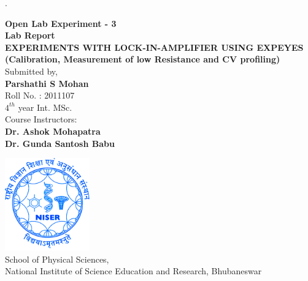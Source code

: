 \documentclass{article}
\begin{document}
\begin{titlepage}
.
\centering


\vspace{.7in}

\textup{\Large {\bf Open Lab Experiment - 3}
}\\[0.3in]
\textup{\Large {\bf Lab Report}
}\\[0.5in]
\Large \textbf {EXPERIMENTS WITH LOCK-IN-AMPLIFIER USING EXPEYES
(Calibration, Measurement of low Resistance and CV profiling)}\\[0.5in]


       

\Large Submitted by, \\[0.3in]
\Large\textbf{Parshathi S Mohan}\\[0.1in]
\Large{Roll No. : 2011107}\\[0.1in]

\Large{$4^{th}$ year Int. MSc.}\\[0.1in]


\vspace{.2in}
\centering
\Large Course Instructors: \\[0.2in]
\Large\textbf{Dr. Ashok Mohapatra}\\[0.1in]
\Large\textbf{Dr. Gunda Santosh Babu}\\[0.1in]
\vspace{.3in}

\includegraphics[height=4cm]{Images/niser-logo-blue.jpg}\\
\vspace{.3in}
School of Physical Sciences,\\[0.1in]

\Large{National Institute of Science Education and Research, Bhubaneswar}




\end{titlepage}
\newpage
\begin{center}
  \tableofcontents  
\end{center}
\end{document}
